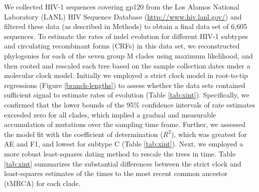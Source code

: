 \documentclass[12pt]{article}
\newcommand{\todo}[2]{\hl{\textbf{#1:} #2}}
\begin{document}
We collected HIV-1 sequences covering gp120 from the Los Alamos National Laboratory (LANL) HIV Sequence Database (\url{http://www.hiv.lanl.gov/}) and filtered these data (as described in Methods) to obtain a final data set of 6,605 sequences. 
To estimate the rates of indel evolution for different HIV-1 subtypes and circulating recombinant forms (CRFs) in this data set, we reconstructed phylogenies for each of the seven group M clades using maximum likelihood, and then rooted and rescaled each tree based on the sample collection dates under a molecular clock model.
Initially we employed a strict clock model in root-to-tip regressions (Figure \ref{branch-lengths}) to assess whether the data sets contained sufficient signal to estimate rates of evolution (Table \ref{tab:xint}).
Specifically, we confirmed that the lower bounds of the 95\% confidence intervals of rate estimates exceeded zero for all clades, which implied a gradual and measurable accumulation of mutations over the sampling time frame.
Further, we assessed the model fit with the coefficient of determination ($R^2$), which was greatest for AE and F1, and lowest for subtype C (Table \ref{tab:xint}).
Next, we employed a more robust least-squares dating method \citep{To:2015} to rescale the trees in time.  
Table \ref{tab:xint} summarizes the substantial differences between the strict clock and least-squares estimates of the times to the most recent common ancestor (tMRCA) for each clade.
\end{document}
